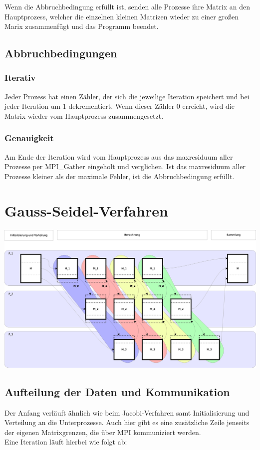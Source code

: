 \documentclass[a4paper]{scrartcl}
\begin{document}
Wenn die Abbruchbedingung erfüllt ist, senden alle Prozesse ihre Matrix an
den Hauptprozess, welcher die einzelnen kleinen Matrizen wieder zu einer großen
Marix zusammenfügt und das Programm beendet.

\subsection{Abbruchbedingungen}
\subsubsection{Iterativ}
Jeder Prozess hat einen Zähler, der sich die jeweilige Iteration speichert
und bei jeder Iteration um 1 dekrementiert. Wenn dieser Zähler 0 erreicht, wird
die Matrix wieder vom Hauptprozess zusammengesetzt.

\subsubsection{Genauigkeit}
Am Ende der Iteration wird vom Hauptprozess aus das maxresiduum aller Prozesse
per MPI\_Gather eingeholt und verglichen. Ist das maxresiduum aller Prozesse
kleiner als der maximale Fehler, ist die Abbruchbedingung erfüllt.

\newpage
\section{Gauss-Seidel-Verfahren}
\includegraphics[scale=0.25]{GaussSeidel.eps}

\subsection{Aufteilung der Daten und Kommunikation}
Der Anfang verläuft ähnlich wie beim Jacobi-Verfahren samt Initialisierung
und Verteilung an die Unterprozesse. Auch hier gibt es eine zusätzliche
Zeile jenseits der eigenen Matrixgrenzen, die über MPI kommuniziert werden.\\
Eine Iteration läuft hierbei wie folgt ab:
\end{document}
